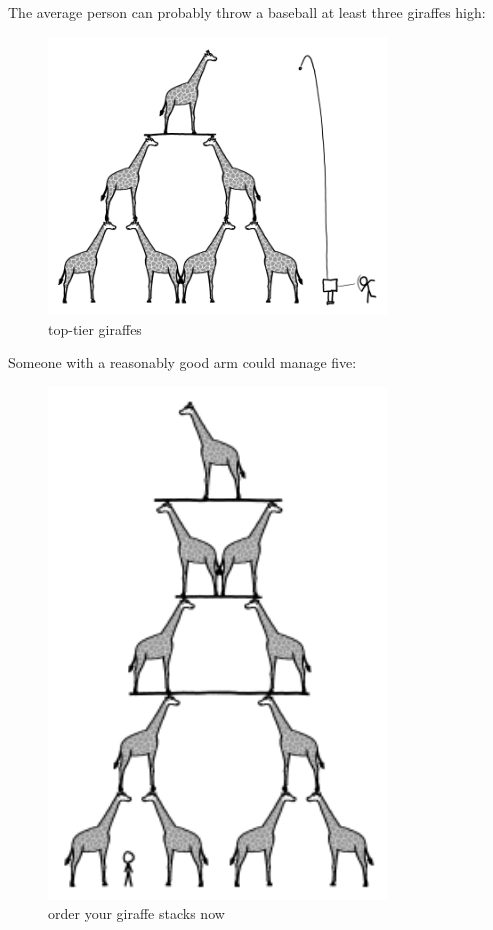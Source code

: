 {{The average person can probably throw a baseball at least three giraffes high:}

\begin{figure}[!htbp]
\centering
\includegraphics[scale=0.5, max width=0.8\textwidth]{imgs/a/44/high_throw_3.png}
\caption{top-tier giraffes}
\end{figure}

{Someone with a reasonably good arm could manage five:}

\begin{figure}[!htbp]
\centering
\includegraphics[scale=0.5, max width=0.8\textwidth]{imgs/a/44/high_throw_5.png}
\caption{order your giraffe stacks now}
\end{figure}

}
